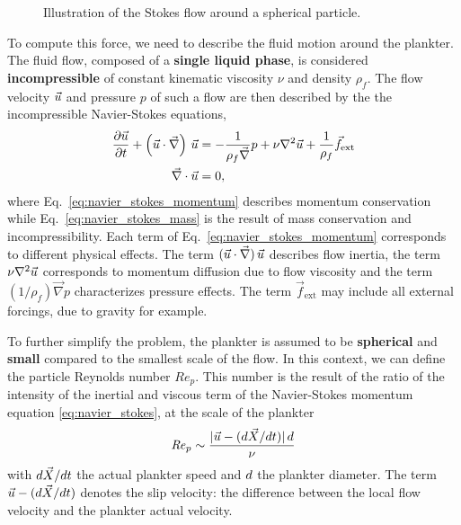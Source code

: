 \begin{wrapfigure}[14]{R}[0.4\width]{0.3\textwidth}
	\vspace{-5pt}
	\centering
	\def\svgwidth{0.25\textwidth}
	
	\captionsetup{width=0.25\textwidth}
  	\caption{
  		Illustration of the Stokes flow around a spherical particle.
  	}
  	\label{fig:stokes_flow}
\end{wrapfigure}
To compute this force, we need to describe the fluid motion around the plankter.
The fluid flow, composed of a \textbf{single liquid phase}, is considered \textbf{incompressible} of constant kinematic viscosity $\nu$ and density $\rho_f$.
The flow velocity $\vec{u}$ and pressure $p$ of such a flow are then described by the the incompressible Navier-Stokes equations,
\begin{subequations}\label{eq:navier_stokes}
	\begin{align}
		\frac{\partial \vec{u}}{\partial t} + \left( \vec{u} \cdot \vec{\nabla} \right) \, \vec{u} & =
		- \frac{1}{\rho_f \vec{\nabla}} p + \nu \nabla^2 \vec{u} + \frac{1}{\rho_f} \vec{f}_{\mathrm{ext}}\label{eq:navier_stokes_momentum} \\
		\vec{\nabla} \cdot \vec{u} & = 0,\label{eq:navier_stokes_mass}
	\end{align}
\end{subequations}
where Eq.~\eqref{eq:navier_stokes_momentum} describes momentum conservation while Eq.~\eqref{eq:navier_stokes_mass} is the result of mass conservation and incompressibility.
Each term of Eq.~\eqref{eq:navier_stokes_momentum} corresponds to different physical effects. 
The term $( \vec{u} \cdot \vec{\nabla} ) \, \vec{u}$ describes flow inertia, the term $\nu \nabla^2 \vec{u}$ corresponds to momentum diffusion due to flow viscosity and the term $(1/\rho_f) \vec{\nabla} p$ characterizes pressure effects.
The term $\vec{f}_{\mathrm{ext}}$ may include all external forcings, due to gravity for example. %

To further simplify the problem, the plankter is assumed to be \textbf{spherical} and \textbf{small} compared to the smallest scale of the flow. %
In this context, we can define the particle Reynolds number $\mathit{Re}_{p}$.
This number is the result of the ratio of the intensity of the inertial and viscous term of the Navier-Stokes momentum equation \eqref{eq:navier_stokes}, at the scale of the plankter
\begin{equation}\label{eq:particle_reynolds_number}
	\mathit{Re}_p \sim \frac{\lvert\vec{u} - (d\vec{X}/dt)\rvert \, d}{\nu}
\end{equation}
with $d \vec{X} / dt$ the actual plankter speed and $d$ the plankter diameter.
The term $\vec{u} - (d\vec{X}/dt)$ denotes the slip velocity: the difference between the local flow velocity and the plankter actual velocity.

